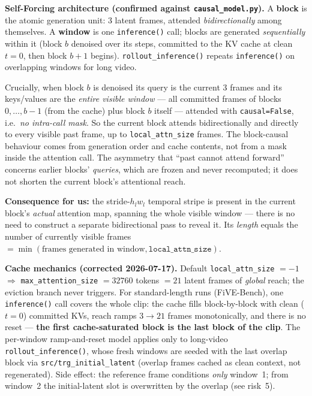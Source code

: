 \documentclass{article}
\begin{document}
\textbf{Self-Forcing architecture (confirmed against \texttt{causal\_model.py}).}
A \textbf{block} is the atomic generation unit: 3 latent frames, attended
\emph{bidirectionally} among themselves. A \textbf{window} is one
\texttt{inference()} call; blocks are generated \emph{sequentially} within it
(block $b$ denoised over its steps, committed to the KV cache at clean $t=0$,
then block $b{+}1$ begins). \texttt{rollout\_inference()} repeats
\texttt{inference()} on overlapping windows for long video.

Crucially, when block $b$ is denoised its query is the current 3 frames and its
keys/values are the \emph{entire visible window} --- all committed frames of
blocks $0,\ldots,b{-}1$ (from the cache) plus block $b$ itself --- attended with
\texttt{causal=False}, i.e.\ \emph{no intra-call mask}. So the current block
attends bidirectionally and directly to every visible past frame, up to
\texttt{local\_attn\_size} frames. The block-causal behaviour comes from
generation order and cache contents, not from a mask inside the attention call.
The asymmetry that ``past cannot attend forward'' concerns earlier blocks'
\emph{queries}, which are frozen and never recomputed; it does not shorten the
current block's attentional reach.

\textbf{Consequence for us:} the stride-$h_l w_l$ temporal stripe is present in
the current block's \emph{actual} attention map, spanning the whole visible
window --- there is no need to construct a separate bidirectional pass to reveal
it. Its \emph{length} equals the number of currently visible frames
$= \min(\text{frames generated in window}, \texttt{local\_attn\_size})$.

\textbf{Cache mechanics (corrected 2026-07-17).} Default
\texttt{local\_attn\_size} $= -1$ $\Rightarrow$ \texttt{max\_attention\_size}
$= 32760$ tokens $= 21$ latent frames of \emph{global} reach; the eviction
branch never triggers. For standard-length runs (FiVE-Bench), one
\texttt{inference()} call covers the whole clip: the cache fills block-by-block
with clean ($t=0$) committed KVs, reach ramps $3 \to 21$ frames monotonically,
and there is no reset --- \textbf{the first cache-saturated block is the last
block of the clip}. The per-window ramp-and-reset model applies only to
long-video \texttt{rollout\_inference()}, whose fresh windows are seeded with
the last overlap block via \texttt{src/trg\_initial\_latent} (overlap frames
cached as clean context, not regenerated). Side effect: the reference frame
conditions \emph{only} window~1; from window~2 the initial-latent slot is
overwritten by the overlap (see risk~5).
\end{document}

